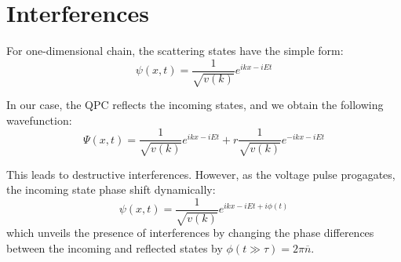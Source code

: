 \documentclass[aps,prl,preprint,groupedaddress]{revtex4-1}
\begin{document}
\section{Interferences}
For one-dimensional chain, the scattering states have the simple form:
\begin{equation}
	\psi(x,t) =  \frac{1}{\sqrt{v(k)}} e^{ikx - iEt}
\end{equation}

In our case, the QPC reflects the incoming states, and we obtain the following wavefunction:
\begin{equation}
\Psi(x,t) = \frac{1}{\sqrt{v(k)}} e^{ikx - iEt} + r\frac{1}{\sqrt{v(k)}} e^{-ikx - iEt}
\end{equation}

This leads to destructive interferences. However, as the voltage pulse progagates, the incoming state phase shift dynamically:
\begin{equation}
\psi(x,t) =  \frac{1}{\sqrt{v(k)}} e^{ikx - iEt + i\phi(t)}
\end{equation}
which unveils the presence of interferences by changing the phase differences between the incoming and reflected states by $\phi(t\gg \tau) = 2\pi \overline{n}$.


\end{document}
